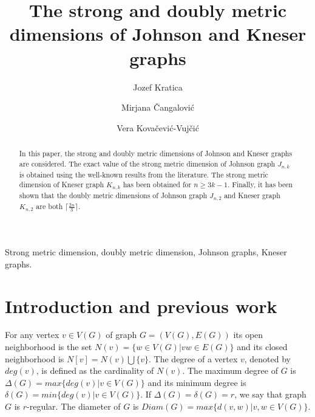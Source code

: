 \documentclass[preprint,12pt]{elsarticle}
\begin{document}
\begin{frontmatter}

\title{The strong and doubly metric dimensions of Johnson and Kneser graphs}

\author{Jozef Kratica }
\author{Mirjana \v{C}angalovi\'c }
\author{Vera Kova\v{c}evi\'c-Vuj\v{c}i\'c }

 \address[mi]{Mathematical Institute, Serbian Academy of Sciences and Arts, Kneza Mihaila 36/III, 11 000 Belgrade, Serbia}
 \address[fon]{Faculty of Organizational Sciences, University of  Belgrade, Jove Ili\'ca 154, 11000 Belgrade, Serbia}    


\begin{abstract}
In this paper, the strong and doubly metric dimensions of Johnson and Kneser graphs are considered. 
The exact value of the strong metric dimension of Johnson graph $J_{n,k}$ is obtained using
the well-known results from the literature. The strong metric dimension of Kneser graph
$K_{n,k}$ has been obtained for $n \ge 3k-1$. Finally, it has been shown that 
the doubly metric dimensions of Johnson graph $J_{n,2}$ and Kneser graph $K_{n,2}$
are both $\lceil \frac{2n}{3} \rceil$.  
\end{abstract}

\begin{keyword}
Strong metric dimension, doubly metric dimension, Johnson graphs, Kneser graphs.
\end{keyword}




\end{frontmatter}


\section{Introduction and previous work}

For any vertex $v \in V(G)$ of graph $G=(V(G),E(G))$ its open neighborhood
is the set $N(v) = \{w \in V(G) | vw \in E(G)\}$ and its closed neighborhood is
$N[v] = N(v) \bigcup \{v\}$. The degree of a vertex $v$, denoted by $deg(v)$, 
is defined as the cardinality of $N(v)$.
The maximum degree of $G$ is
$\Delta(G) = max \{deg(v) | v \in V(G)\}$ and its minimum degree is
$\delta(G) = min \{deg(v) | v \in V(G)\}$.
If $\Delta(G)=\delta(G)=r$, we say
that graph $G$ is $r$-regular.
The diameter of $G$ is $Diam(G) = max \{d(v,w) | v,w \in V(G)\}$. 
\end{document}
